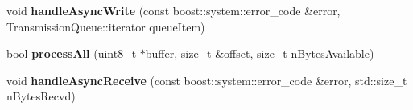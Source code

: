 \begin{DoxyCompactItemize}
\item 
void {\bfseries handle\+Async\+Write} (const boost\+::system\+::error\+\_\+code \&error, Transmission\+Queue\+::iterator queue\+Item)\hypertarget{classndn_1_1StreamTransportImpl_abac5397856a32c8f3fd282de95b2ee2f}{}\label{classndn_1_1StreamTransportImpl_abac5397856a32c8f3fd282de95b2ee2f}

\item 
bool {\bfseries process\+All} (uint8\+\_\+t $\ast$buffer, size\+\_\+t \&offset, size\+\_\+t n\+Bytes\+Available)\hypertarget{classndn_1_1StreamTransportImpl_a5ebf33656496f6b4e386b05ee2a68d69}{}\label{classndn_1_1StreamTransportImpl_a5ebf33656496f6b4e386b05ee2a68d69}

\item 
void {\bfseries handle\+Async\+Receive} (const boost\+::system\+::error\+\_\+code \&error, std\+::size\+\_\+t n\+Bytes\+Recvd)\hypertarget{classndn_1_1StreamTransportImpl_a8b1c0dc70c0355c981446ff585ca525b}{}\label{classndn_1_1StreamTransportImpl_a8b1c0dc70c0355c981446ff585ca525b}

\end{DoxyCompactItemize}
